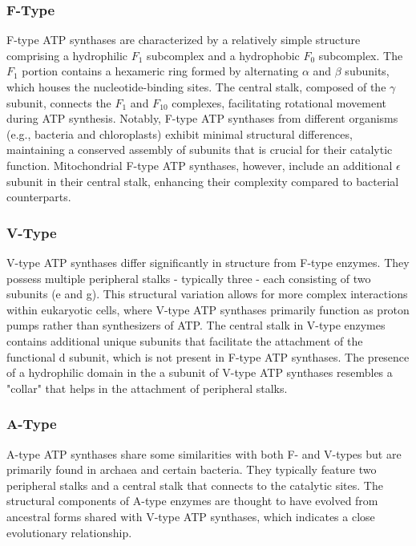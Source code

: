 \documentclass{article}
\begin{document}
\subsubsection{F-Type}

F-type ATP synthases are characterized by a relatively simple structure comprising a hydrophilic \textit{$F_1$} subcomplex and a hydrophobic \textit{$F_0$} subcomplex. The \textit{$F_1$} portion contains a hexameric ring formed by alternating $\alpha$ and $\beta$ subunits, which houses the nucleotide-binding sites. The central stalk, composed of the $\gamma$ subunit, connects the \textit{$F_1$} and \textit{$F_10$} complexes, facilitating rotational movement during ATP synthesis. Notably, F-type ATP synthases from different organisms (e.g., bacteria and chloroplasts) exhibit minimal structural differences, maintaining a conserved assembly of subunits that is crucial for their catalytic function. Mitochondrial F-type ATP synthases, however, include an additional $\epsilon$ subunit in their central stalk, enhancing their complexity compared to bacterial counterparts.

\subsubsection{V-Type}

V-type ATP synthases differ significantly in structure from F-type enzymes. They possess multiple peripheral stalks - typically three - each consisting of two subunits (e and g). This structural variation allows for more complex interactions within eukaryotic cells, where V-type ATP synthases primarily function as proton pumps rather than synthesizers of ATP. The central stalk in V-type enzymes contains additional unique subunits that facilitate the attachment of the functional d subunit, which is not present in F-type ATP synthases. The presence of a hydrophilic domain in the a subunit of V-type ATP synthases resembles a "collar" that helps in the attachment of peripheral stalks.

\subsubsection{A-Type}

A-type ATP synthases share some similarities with both F- and V-types but are primarily found in archaea and certain bacteria. They typically feature two peripheral stalks and a central stalk that connects to the catalytic sites. The structural components of A-type enzymes are thought to have evolved from ancestral forms shared with V-type ATP synthases, which indicates a close evolutionary relationship.
\end{document}
